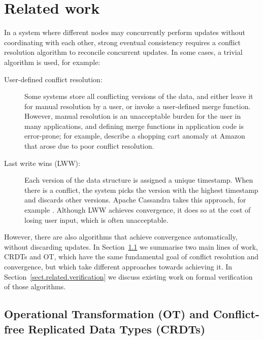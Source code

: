 \vspace{-0.1em}
\section{Related work}\label{sect.relatedwork}

In a system where different nodes may concurrently perform updates without coordinating with each other, strong eventual consistency requires a conflict resolution algorithm to reconcile concurrent updates. 
In some cases, a trivial algorithm is used, for example:

\begin{description}
\item[User-defined conflict resolution:] Some systems store all conflicting versions of the data,
and either leave it for manual resolution by a user, or invoke a user-defined merge function.
However, manual resolution is an unacceptable burden for the user in many applications, and defining
merge functions in application code is error-prone; for example, \citet{DeCandia:2007ui} describe a
shopping cart anomaly at Amazon that arose due to poor conflict resolution.

\item[Last write wins (LWW):] Each version of the data structure is assigned a unique timestamp.
When there is a conflict, the system picks the version with the highest timestamp and discards other
versions. Apache Cassandra takes this approach, for example \cite{KingsburyCassandra}.
Although LWW achieves convergence, it does so at the cost of losing user input, which is often unacceptable.
\end{description}

However, there are also algorithms that achieve convergence automatically, without discarding updates.
In Section~\ref{sect.related.ot.crdts} we summarise two main lines of work, CRDTs and OT, which have the same fundamental goal of conflict resolution and convergence, but which take different approaches towards achieving it.
In Section~\ref{sect.related.verification} we discuss existing work on formal verification of those algorithms.

\vspace{-0.25em}
\subsection{Operational Transformation (OT) and Conflict-free Replicated Data Types (CRDTs)}\label{sect.related.ot.crdts}

